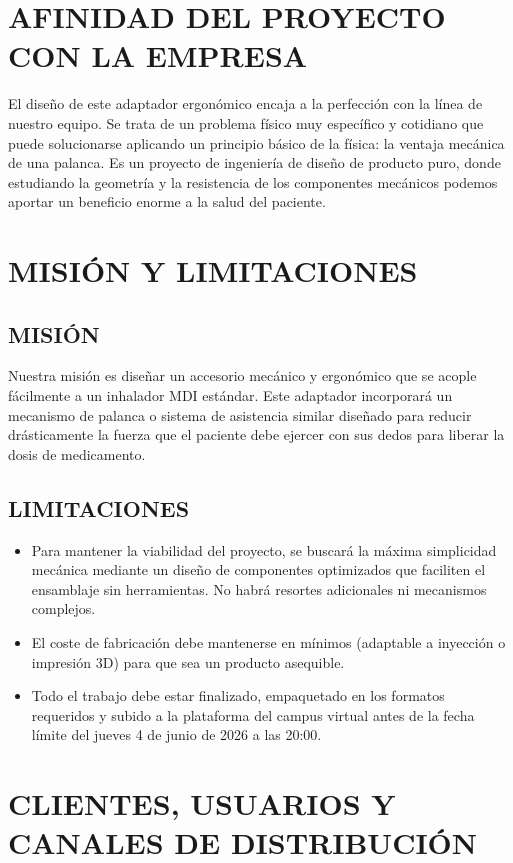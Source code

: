 \documentclass[11pt,a4paper]{article}
\begin{document}
\section{AFINIDAD DEL PROYECTO CON LA EMPRESA}
El diseño de este adaptador ergonómico encaja a la perfección con la línea de nuestro equipo. Se trata de un problema físico muy específico y cotidiano que puede solucionarse aplicando un principio básico de la física: la ventaja mecánica de una palanca. Es un proyecto de ingeniería de diseño de producto puro, donde estudiando la geometría y la resistencia de los componentes mecánicos podemos aportar un beneficio enorme a la salud del paciente.

\section{MISIÓN Y LIMITACIONES}
\subsection{MISIÓN}
Nuestra misión es diseñar un accesorio mecánico y ergonómico que se acople fácilmente a un inhalador MDI estándar. Este adaptador incorporará un mecanismo de palanca o sistema de asistencia similar diseñado para reducir drásticamente la fuerza que el paciente debe ejercer con sus dedos para liberar la dosis de medicamento.


\subsection{LIMITACIONES}
\begin{itemize}
    \item Para mantener la viabilidad del proyecto, se buscará la máxima simplicidad mecánica mediante un diseño de componentes optimizados que faciliten el ensamblaje sin herramientas. No habrá resortes adicionales ni mecanismos complejos.
    \item El coste de fabricación debe mantenerse en mínimos (adaptable a inyección o impresión 3D) para que sea un producto asequible.
    \item  Todo el trabajo debe estar finalizado, empaquetado en los formatos requeridos y subido a la plataforma del campus virtual antes de la fecha límite del jueves 4 de junio de 2026 a las 20:00.
\end{itemize}


\section{CLIENTES, USUARIOS Y CANALES DE DISTRIBUCIÓN}
\end{document}
